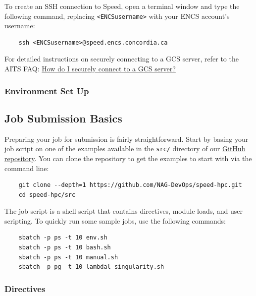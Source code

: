 \documentclass{easychair}
\begin{document}
\noindent To create an SSH connection to Speed, open a terminal window and type the following command, replacing \verb!<ENCSusername>! with your ENCS account's username:
\begin{verbatim}
    ssh <ENCSusername>@speed.encs.concordia.ca
\end{verbatim}

\noindent For detailed instructions on securely connecting to a GCS server, refer to the AITS FAQ: 
\href{https://www.concordia.ca/ginacody/aits/support/faq/ssh-to-gcs.html}{How do I securely connect to a GCS server?}

\subsubsection{Environment Set Up}
\label{sect:envsetup}


\subsection{Job Submission Basics}
\label{sect:job-submission-basics}

Preparing your job for submission is fairly straightforward.
Start by basing your job script on one of the examples available in the \texttt{src/}
directory of our \href{https://github.com/NAG-DevOps/speed-hpc}{GitHub repository}.
You can clone the repository to get the examples to start with via the command line:

\begin{verbatim}
    git clone --depth=1 https://github.com/NAG-DevOps/speed-hpc.git
    cd speed-hpc/src
\end{verbatim}

\noindent The job script is a shell script that contains directives, module loads, and user scripting.
To quickly run some sample jobs, use the following commands:
\begin{verbatim}
    sbatch -p ps -t 10 env.sh
    sbatch -p ps -t 10 bash.sh
    sbatch -p ps -t 10 manual.sh
    sbatch -p pg -t 10 lambdal-singularity.sh
\end{verbatim}

\subsubsection{Directives}
\label{sect:directives}

\end{document}
